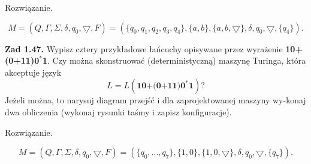 \documentclass[12pt]{article}
\begin{document}
 Rozwiązanie.
 
\[M=(Q,\Gamma,\Sigma,\delta,q_0,\bigtriangledown,F)=(\{q_0,q_1,q_2,q_3,q_4\},\{a,b\},\{a,b,\bigtriangledown\},\delta,q_0,\bigtriangledown,\{q_4\}).\]

\begin{center}
\end{center}

\newpage

\noindent\textbf{Zad 1.47.} Wypisz cztery przykładowe łańcuchy opisywane przez wyrażenie \textbf{10+(0+11)$\textbf{0}^*$1}. Czy można skonstruować (deterministyczną) maszynę Turinga, która akceptuje język
\[L=L(\textbf{10+(0+11)$\textbf{0}^*$1})?\]
Jeżeli można, to narysuj diagram przejść i dla zaprojektowanej maszyny wy-konaj dwa obliczenia (wykonaj rysunki taśmy i zapisz konfiguracje).

 Rozwiązanie.
 
\[M=(Q,\Gamma,\Sigma,\delta,q_0,\bigtriangledown,F)=(\{q_0,...,q_7\},\{1,0\},\{1,0,\bigtriangledown\},\delta,q_0,\bigtriangledown,\{q_7\}).\]
\end{document}
